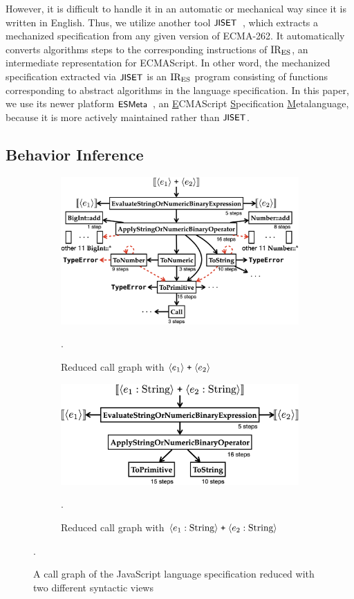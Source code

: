 However, it is difficult to handle it in an automatic or mechanical way since it
is written in English.  Thus, we utilize another tool $\textsf{\small JISET}$~\cite{jiset},
which extracts a mechanized specification from any given version of ECMA-262.
It automatically converts algorithms steps to the corresponding instructions of
$\text{IR}_\text{ES}$, an intermediate representation for ECMAScript.  In other word, the
mechanized specification extracted via $\textsf{\small JISET}$ is an $\text{IR}_\text{ES}$ program consisting
of functions corresponding to abstract algorithms in the language specification.
In this paper, we use its newer platform $\textsf{\small ESMeta}$~\cite{esmeta}, an
\underline{E}CMAScript \underline{S}pecification \underline{M}etalanguage,
because it is more actively maintained rather than $\textsf{\small JISET}$.


\subsection{Behavior Inference}\label{sec:reduce-spec}

\begin{figure}
  \centering
  \begin{subfigure}[t]{\columnwidth}
    \centering
    \includegraphics[width=\textwidth]{img/add-basic.png}
    \caption{Reduced call graph with $\langle e_1 \rangle \; \texttt{+} \;
    \langle e_2 \rangle$}
    \label{fig:add-basic-graph}.
  \end{subfigure}
  \begin{subfigure}[t]{\columnwidth}
    \centering
    \includegraphics[width=.8\textwidth]{img/add-str.png}
    \caption{Reduced call graph with $\langle e_1: \text{String} \rangle \;
    \texttt{+} \; \langle e_2: \text{String} \rangle$}
    \label{fig:add-str-graph}.
  \end{subfigure}
  \caption{A call graph of the JavaScript language specification reduced with
    two different syntactic views}
  \vspace*{-1em}
  \label{fig:add-graph}.
\end{figure}

